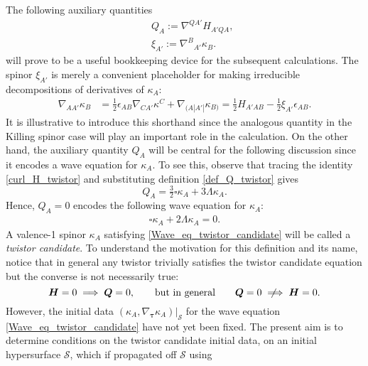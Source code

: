\documentclass[10pt,a4paper]{article}
\theoremstyle{plain}
\def\bmH{{\bm H}}
\def\bmQ{{\bm Q}}
\newcommand{\notimplies}{%
  \mathrel{{\ooalign{\hidewidth$\not\phantom{=}$\hidewidth\cr$\implies$}}}}
\begin{document}
The following auxiliary quantities
\begin{subequations}\label{def_twistor_aux_quants}
  \begin{eqnarray}
      && Q_{A}  := \nabla^{QA'}H_{A'QA}, \label{def_Q_twistor} \\
      && \xi_{A'} := \nabla^B{}_{A'}\kappa_B. \label{def_xi_twistor}
  \end{eqnarray}
\end{subequations}
will prove to be a useful bookkeeping device for the subsequent
calculations.
  The spinor $\xi_{A'}$ is merely a convenient
  placeholder for making irreducible decompositions of derivatives of
  $\kappa_A$:
  \begin{align}\label{decomp_Der_kappa}
    \nabla_{AA'}\kappa _{B} & = \tfrac{1}{2} \epsilon _{AB}
    \nabla_{CA'}\kappa ^{C} + \nabla_{(A|A'|}\kappa _{B)} = \tfrac{1}{2} H_{A'AB} - \tfrac{1}{2} \xi _{A'} \epsilon_{AB}.
  \end{align}
It is illustrative to introduce this
  shorthand since the analogous quantity in the Killing spinor case
  will play an important role in the calculation. On the other hand, the auxiliary quantity
  $Q_A$ will be central for the following discussion since it
  encodes a wave equation for $\kappa_A$. To see this, observe that
  tracing the identity \eqref{curl_H_twistor} and substituting 
  definition \eqref{def_Q_twistor} gives
\begin{equation}\label{Q_to_box_twistor_candidate}
Q_{A} = \tfrac{3}{2} \square \kappa _{A} + 3 \Lambda \kappa _{A}.
\end{equation}
Hence, $Q_{A}=0$ encodes the following wave equation for $\kappa_A$:
\begin{align} \label{Wave_eq_twistor_candidate}
\square \kappa_{A} + 2 \Lambda  \kappa_{A} =0.
\end{align}
A valence-1 spinor $\kappa_A$ satisfying \eqref{Wave_eq_twistor_candidate} will be called a \emph{twistor candidate}. To understand the
motivation for this definition and its name, notice that in general
any twistor trivially satisfies the twistor candidate
equation but the converse is not necessarily true:
\[
\bmH=0 \implies \bmQ =0, \qquad \text{but in general} \qquad \bmQ =0 \notimplies \bmH=0.
\]
However,  the initial data $(\kappa_A, \nabla_{\bm\tau}
\kappa_A)|_{\mathcal{S}}$ for the wave equation
\eqref{Wave_eq_twistor_candidate} have not yet been fixed. The present aim is to determine conditions on the twistor candidate initial data, on an initial hypersurface $\mathcal{S}$, which if propagated off $\mathcal{S}$ using
\end{document}
